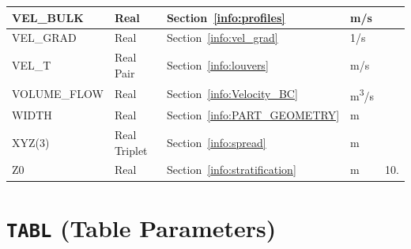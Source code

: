 \documentclass[11pt]{book}
\begin{document}
\begin{longtable}{@{\extracolsep{\fill}}|l|l|l|l|l|}
{\ct VEL\_BULK}                         & Real            & Section~\ref{info:profiles}               & m/s                 &                         \\ \hline
{\ct VEL\_GRAD}                         & Real            & Section~\ref{info:vel_grad}               & 1/s                 &                         \\ \hline
{\ct VEL\_T }                           & Real Pair       & Section~\ref{info:louvers}                & m/s                 &                         \\ \hline
{\ct VOLUME\_FLOW}                      & Real            & Section~\ref{info:Velocity_BC}            & \si{m^3/s}          &                         \\ \hline
{\ct WIDTH}                             & Real            & Section~\ref{info:PART_GEOMETRY}          & m                   &                         \\ \hline
{\ct XYZ(3)}                            & Real Triplet    & Section~\ref{info:spread}                 & m                   &                         \\ \hline
{\ct Z0 }                               & Real            & Section~\ref{info:stratification}         & m                   & 10.                     \\ \hline
\end{longtable}


\vspace{\baselineskip}


\section{\texorpdfstring{{\tt TABL}}{TABL} (Table Parameters)}
\end{document}
